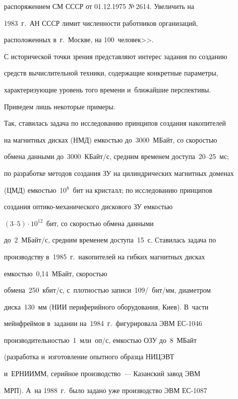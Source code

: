 распоряжением СМ \mbox{СССР} от 01.12.1975 №\,2614. Увеличить на 

1983~г.\ АН \mbox{СССР} лимит чис\-лен\-ности работников организаций, 

расположенных в~г.~Москве, на 100~человек>>.

   

   С исторической точки зрения представляют интерес задания по созданию 

средств вы\-чис\-ли\-тель\-ной техники, содержащие конкретные па\-ра\-мет\-ры, 

ха\-рак\-те\-ри\-зу\-ющие уровень того времени и~ближайшие перспективы. 

Приведем лишь некоторые примеры. 

   

   Так, ставилась задача по исследованию принципов создания накопителей 

на магнитных дис\-ках (НМД) ем\-костью до~3000~МБайт, со ско\-ростью 

обмена данными до~3000~КБайт\!/\!с, сред\-ним временем до\-сту\-па~20--25~мс; 

по разработке методов создания ЗУ на цилиндрических магнитных доменах 

(ЦМД) ем\-костью~10$^8$~бит на крис\-талл; по исследованию принципов 

создания оп\-ти\-ко-ме\-ха\-ни\-че\-ско\-го дискового ЗУ ем\-костью 

$(3\mbox{--}5)\cdot 10^{12}$~бит, со ско\-ростью обмена данными 

до~2~МБайт\!/\!с, средним временем доступа~15~с. Ставилась задача по 

производству в~1985~г.\ накопителей на гибких магнитных дисках

 ем\-костью~0,14~МБайт, ско\-ростью 

обмена~250~кбит\!/\!с, с~плот\-ностью записи~109\!/~бит\!/\!мм, диа\-мет\-ром 

дис\-ка~130~мм (НИИ периферийного оборудования, Киев). В~час\-ти 

мейнфреймов в~задании на~1984~г.\ фигурировала ЭВМ \mbox{ЕС-1046} 

 про\-из\-во\-ди\-тель\-ностью~1~млн~оп\!/\!с, ем\-костью ОЗУ до~8~МБайт 

(разработка и~изготовление опыт\-но\-го образца \mbox{НИЦЭВТ} 

и~\mbox{ЕРНИИММ}, серийное производство~--- Казанский завод ЭВМ 

МРП). А~на 1988~г.\ было задано уже производство ЭВМ \mbox{ЕС-1087}  

